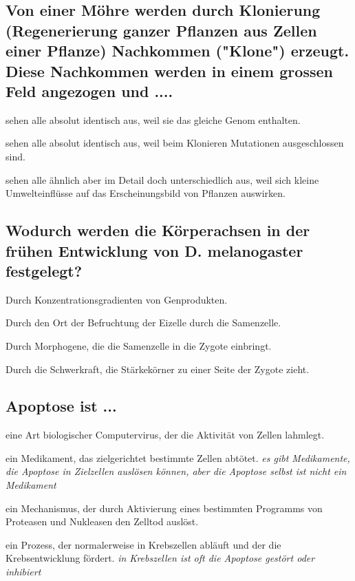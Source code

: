 \documentclass{article}
\newcommand{\cmark}{\ding{51}}%
\newcommand{\done}{\rlap{$\square$}{\raisebox{2pt}{\large\hspace{1pt}\cmark}}%
\hspace{-2.5pt}}
\begin{document}
\subsection*{Von einer Möhre werden durch Klonierung (Regenerierung ganzer
Pflanzen aus Zellen einer Pflanze) Nachkommen ("Klone") erzeugt.
Diese Nachkommen werden in einem grossen Feld angezogen und
....}
\begin{todolist}%
\item sehen alle absolut identisch aus, weil sie das gleiche Genom
enthalten.  
\item sehen alle absolut identisch aus, weil beim Klonieren Mutationen
ausgeschlossen sind.
\item[\done] sehen alle ähnlich aber im Detail doch unterschiedlich aus, weil sich
kleine Umwelteinflüsse auf das Erscheinungsbild von Pflanzen
auswirken.
\end{todolist}

\subsection*{Wodurch werden die Körperachsen in der frühen Entwicklung von D.
melanogaster festgelegt?}
\begin{todolist}%
\item[\done] Durch Konzentrationsgradienten von Genprodukten.
\item Durch den Ort der Befruchtung der Eizelle durch die Samenzelle.
\item Durch Morphogene, die die Samenzelle in die Zygote einbringt.
\item Durch die Schwerkraft, die Stärkekörner zu einer Seite der Zygote
zieht.
\end{todolist}

\subsection*{Apoptose ist ...}
\begin{todolist}%
\item eine Art biologischer Computervirus, der die Aktivität von Zellen
lahmlegt. \textit{\scriptsize }
\item ein Medikament, das zielgerichtet bestimmte Zellen abtötet. \textit{\scriptsize es gibt Medikamente, die Apoptose in Zielzellen auslösen können, aber die Apoptose selbst ist nicht ein Medikament}
\item[\done] ein Mechanismus, der durch Aktivierung eines bestimmten
Programms von Proteasen und Nukleasen den Zelltod auslöst. \textit{\scriptsize }
\item ein Prozess, der normalerweise in Krebszellen abläuft und der die
Krebsentwicklung fördert. \textit{\scriptsize in Krebszellen ist oft die Apoptose gestört oder inhibiert}
\end{todolist}
\end{document}
